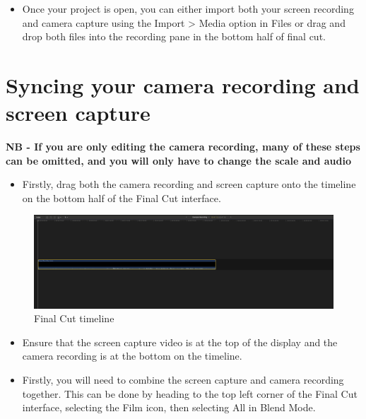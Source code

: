\documentclass[
]{book}
\providecommand{\tightlist}{%
  \setlength{\itemsep}{0pt}\setlength{\parskip}{0pt}}
\begin{document}
\begin{itemize}
\tightlist
\item
  Once your project is open, you can either import both your screen recording and camera capture using the Import \textgreater{} Media option in Files or drag and drop both files into the recording pane in the bottom half of final cut.
\end{itemize}

\hypertarget{syncing-your-camera-recording-and-screen-capture}{%
\section{Syncing your camera recording and screen capture}\label{syncing-your-camera-recording-and-screen-capture}}

\textbf{NB - If you are only editing the camera recording, many of these steps can be omitted, and you will only have to change the scale and audio}

\begin{itemize}
\tightlist
\item
  Firstly, drag both the camera recording and screen capture onto the timeline on the bottom half of the Final Cut interface.
\end{itemize}

\begin{figure}

{\centering \includegraphics[width=1\linewidth]{FinalCutTimeline} 

}

\caption{Final Cut timeline}\label{fig:timeline}
\end{figure}

\begin{itemize}
\item
  Ensure that the screen capture video is at the top of the display and the camera recording is at the bottom on the timeline.
\item
  Firstly, you will need to combine the screen capture and camera recording together. This can be done by heading to the top left corner of the Final Cut interface, selecting the Film icon, then selecting All in Blend Mode.
\end{itemize}
\end{document}
